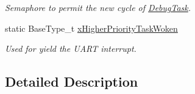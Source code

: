 \begin{DoxyCompactItemize}
\begin{DoxyCompactList}\small\item\em Semaphore to permit the new cycle of \hyperlink{group___debug___exported___functions___group2_ga0e7fca846e34e06a1f62249fe8a30a44}{Debug\+Task}. \end{DoxyCompactList}\item 
static Base\+Type\+\_\+t \hyperlink{group___debug___private___variables_ga9d9a749ad99ec3d4a6886d5277b9ba87}{x\+Higher\+Priority\+Task\+Woken}\hypertarget{group___debug___private___variables_ga9d9a749ad99ec3d4a6886d5277b9ba87}{}\label{group___debug___private___variables_ga9d9a749ad99ec3d4a6886d5277b9ba87}

\begin{DoxyCompactList}\small\item\em Used for yield the U\+A\+RT interrupt. \end{DoxyCompactList}\end{DoxyCompactItemize}


\subsection{Detailed Description}
